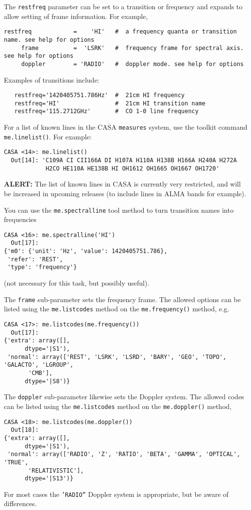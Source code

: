 The {\tt restfreq} parameter can be set to a transition or frequency
and expands to allow setting of frame information.  For example,
\small
\begin{verbatim}
restfreq            =    'HI'   #  a frequency quanta or transition name. see help for options
     frame          =  'LSRK'   #  frequency frame for spectral axis. see help for options
     doppler        = 'RADIO'   #  doppler mode. see help for options
\end{verbatim}
\normalsize
Examples of transitions include:
\small
\begin{verbatim}
   restfreq='1420405751.786Hz'  #  21cm HI frequency
   restfreq='HI'                #  21cm HI transition name
   restfreq='115.2712GHz'       #  CO 1-0 line frequency
\end{verbatim}
\normalsize
For a list of known lines in the CASA {\tt measures} system, use the
toolkit command {\tt me.linelist()}.  For example:
\small
\begin{verbatim}
CASA <14>: me.linelist()
  Out[14]: 'C109A CI CII166A DI H107A H110A H138B H166A H240A H272A
            H2CO HE110A HE138B HI OH1612 OH1665 OH1667 OH1720'
\end{verbatim}
\normalsize
{\bf ALERT:} The list of known lines in CASA is currently very
restricted, and will be increased in upcoming releases (to include lines
in ALMA bands for example).

You can use the {\tt me.spectralline} tool method to turn transition names into
frequencies 
\small
\begin{verbatim}
CASA <16>: me.spectralline('HI')
  Out[17]: 
{'m0': {'unit': 'Hz', 'value': 1420405751.786},
 'refer': 'REST',
 'type': 'frequency'}
\end{verbatim}
\normalsize
(not necessary for this task, but possibly useful).

The {\tt frame} sub-parameter sets the frequency frame.  The allowed
options can be listed using the {\tt me.listcodes} method on the
{\tt me.frequency()} method, e.g.
\small
\begin{verbatim}
CASA <17>: me.listcodes(me.frequency())
  Out[17]: 
{'extra': array([], 
      dtype='|S1'),
 'normal': array(['REST', 'LSRK', 'LSRD', 'BARY', 'GEO', 'TOPO', 'GALACTO', 'LGROUP',
       'CMB'], 
      dtype='|S8')}
\end{verbatim}
\normalsize

The {\tt doppler} sub-parameter likewise sets the Doppler system.  The
allowed codes can be listed using the {\tt me.listcodes} method on the
{\tt me.doppler()} method,
\small
\begin{verbatim}
CASA <18>: me.listcodes(me.doppler())
  Out[18]: 
{'extra': array([], 
      dtype='|S1'),
 'normal': array(['RADIO', 'Z', 'RATIO', 'BETA', 'GAMMA', 'OPTICAL', 'TRUE',
       'RELATIVISTIC'], 
      dtype='|S13')}
\end{verbatim}
\normalsize
For most cases the {\tt 'RADIO''} Doppler system is appropriate, but
be aware of differences.


